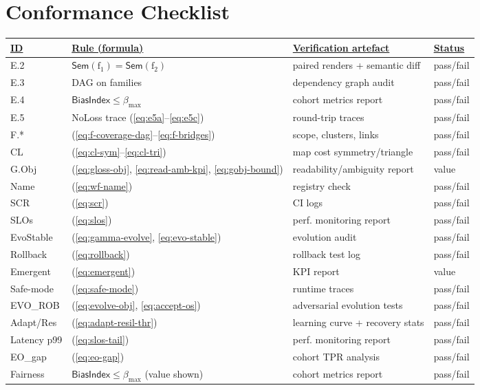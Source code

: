 \documentclass[conference]{IEEEtran}
\begin{document}
\FloatBarrier

\section{Conformance Checklist}
\begin{table}[!hbt]
\centering
\footnotesize
\setlength{\tabcolsep}{3pt}
\renewcommand{\arraystretch}{1.03}
\begin{tabular}{p{.18\linewidth}p{.32\linewidth}p{.32\linewidth}p{.12\linewidth}}
\underline{ID} & \underline{Rule (formula)} & \underline{Verification artefact} & \underline{Status} \\
\hline
E.2 & $\mathsf{Sem}(\mathrm{f}_1)=\mathsf{Sem}(\mathrm{f}_2)$ & paired renders + semantic diff & pass/fail \\
E.3 & DAG on families & dependency graph audit & pass/fail \\
E.4 & $\mathsf{BiasIndex}\le \beta_{\max}$ & cohort metrics report & pass/fail \\
E.5 & NoLoss trace (\ref{eq:e5a}--\ref{eq:e5c}) & round-trip traces & pass/fail \\
F.* & (\ref{eq:f-coverage-dag}--\ref{eq:f-bridges}) & scope, clusters, links & pass/fail \\
CL  & (\ref{eq:cl-sym}--\ref{eq:cl-tri}) & map cost symmetry/triangle & pass/fail \\
G.Obj & (\ref{eq:gloss-obj}, \ref{eq:read-amb-kpi}, \ref{eq:gobj-bound}) & readability/ambiguity report & value \\
Name & (\ref{eq:wf-name}) & registry check & pass/fail \\
SCR & (\ref{eq:scr}) & CI logs & pass/fail \\
SLOs & (\ref{eq:slos}) & perf. monitoring report & pass/fail \\
EvoStable & (\ref{eq:gamma-evolve}, \ref{eq:evo-stable}) & evolution audit & pass/fail \\
Rollback & (\ref{eq:rollback}) & rollback test log & pass/fail \\
Emergent & (\ref{eq:emergent}) & KPI report & value \\
Safe-mode & (\ref{eq:safe-mode}) & runtime traces & pass/fail \\
EVO\_ROB & (\ref{eq:evolve-obj}, \ref{eq:accept-os}) & adversarial evolution tests & pass/fail \\
Adapt/Res & (\ref{eq:adapt-resil-thr}) & learning curve + recovery stats & pass/fail \\
Latency p99 & (\ref{eq:slos-tail}) & perf. monitoring report & pass/fail \\
EO\_gap & (\ref{eq:eo-gap}) & cohort TPR analysis & pass/fail \\
Fairness & $\mathsf{BiasIndex}\le \beta_{\max}$ (value shown) & cohort metrics report & pass/fail \\
\hline
\end{tabular}
\end{table}
\end{document}
